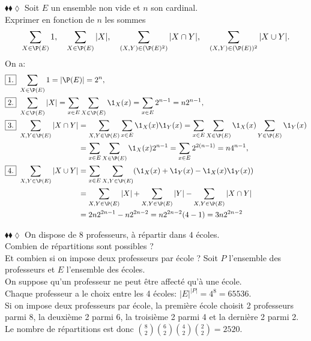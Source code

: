\documentclass[11pt]{article}
\begin{document}
\begin{exercice}{$\blacklozenge\blacklozenge\lozenge$}{}
    Soit $E$ un ensemble non vide et $n$ son cardinal.\\
    Exprimer en fonction de $n$ les sommes
    \begin{equation*}
        \sum_{X\in\P(E)}1,\quad\sum_{X\in\P(E)}|X|,\quad\sum_{(X,Y)\in(\P(E)^2)}|X\cap Y|,\quad\sum_{(X,Y)\in(\P(E))^2}|X\cup Y|.
    \end{equation*}
    \tcblower
    On a:
    \begin{align*}
        &\boxed{1.}~\sum_{X\in\P(E)}1=|\P(E)|=2^n,\\
        &\boxed{2.}~\sum_{X\in\P(E)}|X|=\sum_{x\in E}\sum_{X\in\P(E)}\1_X(x)=\sum_{x\in E}2^{n-1}=n2^{n-1},\\
        &\begin{aligned}
            \boxed{3.}~\sum_{X,Y\in\P(E)}|X\cap Y|&=\sum_{X,Y\in\P(E)}\sum_{x\in E}\1_X(x)\1_Y(x)=\sum_{x\in E}\sum_{X\in\P(E)}\1_X(x)\sum_{Y\in\P(E)}\1_Y(x)\\
            &=\sum_{x\in E}\sum_{X\in\P(E)}\1_X(x)2^{n-1}=\sum_{x\in E}2^{2(n-1)}=n4^{n-1},
        \end{aligned}\\
        &\begin{aligned}
            \boxed{4.}~\sum_{X,Y\in\P(E)}|X\cup Y|&=\sum_{x\in E}\sum_{X,Y\in\P(E)}(\1_X(x)+\1_Y(x)-\1_X(x)\1_Y(x))\\
            &=\sum_{X,Y\in\P(E)}|X|+\sum_{X,Y\in\P(E)}|Y|-\sum_{X,Y\in\P(E)}|X\cap Y|\\
            &=2n2^{2n-1}-n2^{2n-2}=n2^{2n-2}(4-1)=3n2^{2n-2}
        \end{aligned}
    \end{align*}
\end{exercice}

\begin{exercice}{$\blacklozenge\blacklozenge\lozenge$}{}
    On dispose de $8$ professeurs, à répartir dans $4$ écoles.\\
    Combien de répartitions sont possibles ?\\
    Et combien si on impose deux professeurs par école ?
    \tcblower
    Soit $P$ l'ensemble des professeurs et $E$ l'ensemble des écoles.\\
    On suppose qu'un professeur ne peut être affecté qu'à une école.\\
    Chaque professeur a le choix entre les 4 écoles: $|E|^{|P|}=4^8=65536$.\\
    Si on impose deux professeurs par école, la première école choisit 2 professeurs parmi 8, la deuxième 2 parmi 6, la troisième 2 parmi 4 et la dernière 2 parmi 2.\\
    Le nombre de répartitions est donc $\binom{8}{2}\binom{6}{2}\binom{4}{2}\binom{2}{2}=2520$. 
\end{exercice}
\end{document}

